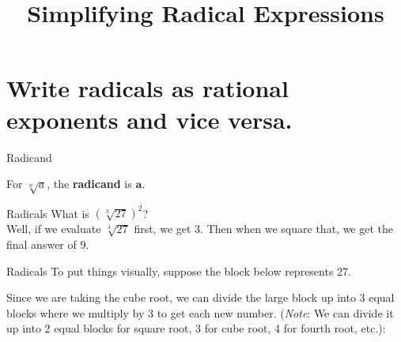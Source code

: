 \documentclass[t,usenames,dvipsnames]{beamer}
\title{Simplifying Radical Expressions}
\author{}
\date{}
\begin{document}
\begin{frame}
    \maketitle
\end{frame}

\section{Write radicals as rational exponents and vice versa.}

\begin{frame}{Radicand}
\begin{tcolorbox}[colframe=green!20!black, colback = green!30!white,title=\textbf{Radicand}]
For $\sqrt[n]{a}$, the \textbf{radicand} is $\bm{a}$.
\end{tcolorbox}
\end{frame}

\begin{frame}{Radicals}
What is $\left(\sqrt[3]{27}\right)^2$? \newline\\

Well, if we evaluate $\sqrt[3]{27}$ first, we get 3. Then when we square that, we get the final answer of 9. 
\end{frame}

\begin{frame}{Radicals} 
To put things visually, suppose the block below represents 27.  

\begin{center}
\end{center}

Since we are taking the cube root, we can divide the large block up into 3 equal blocks where we multiply by 3 to get each new number. (\emph{Note}: We can divide it up into 2 equal blocks for square root, 3 for cube root, 4 for fourth root, etc.):
\begin{center}
\end{center}
\end{frame}
\end{document}
